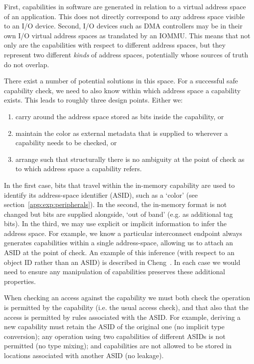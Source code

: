 First, capabilities in software are generated in relation to a virtual address space of an application.
This does not directly correspond to any address space visible to an I/O device.
Second, I/O devices such as DMA controllers may be in their own I/O virtual address spaces as translated by an IOMMU.
This means that not only are the capabilities with respect to different address spaces, but they represent two different \emph{kinds} of address spaces, potentially whose sources of truth do not overlap.

There exist a number of potential solutions in this space.
For a successful safe capability check, we need to also know within which address space a capability exists.
This leads to roughly three design points.  Either we:
\begin{enumerate}
	\item carry around the address space stored as bits inside the capability, or
	\item maintain the color as external metadata that is supplied to wherever a capability needs to be checked, or
	\item arrange such that structurally there is no ambiguity at the point of check as to which address space a capability refers.
\end{enumerate}

In the first case, bits that travel within the in-memory capability are used to identify its address-space identifier (ASID), such as a `color' (see section~\ref{app:exp:peripherals}).
In the second, the in-memory format is not changed but bits are supplied alongside, `out of band' (e.g. as additional tag bits).
In the third, we may use explicit or implicit information to infer the address space.
For example, we know a particular interconnect endpoint always generates capabilities within a single address-space, allowing us to attach an ASID at the point of check.
An example of this inference (with respect to an object ID rather than an ASID) is described in Cheng~\cite{cheng2025-capchecker}.
In each case we would need to ensure any manipulation of capabilities preserves these additional properties.

When checking an access against the capability we must both check the operation is permitted by the capability (i.e. the usual access check), and that also that the access is permitted by rules associated with the ASID.
For example, deriving a new capability must retain the ASID of the original one (no implicit type conversion);
any operation using two capabilities of different ASIDs is not permitted (no type mixing);
and capabilities are not allowed to be stored in locations associated with another ASID (no leakage).

